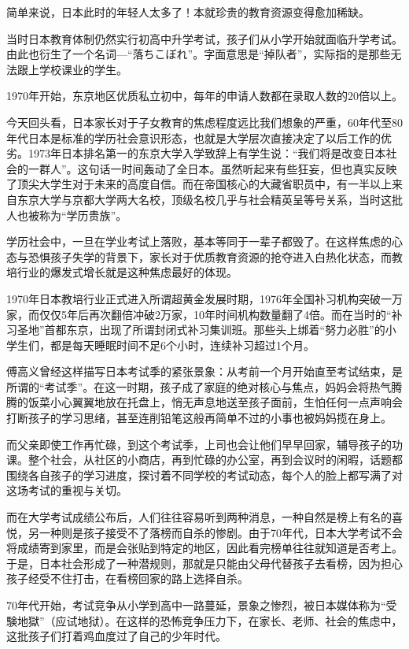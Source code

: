 简单来说，日本此时的年轻人太多了！本就珍贵的教育资源变得愈加稀缺。

当时日本教育体制仍然实行初高中升学考试，孩子们从小学开始就面临升学考试。由此也衍生了一个名词—“落ちこぼれ”。字面意思是“掉队者”，实际指的是那些无法跟上学校课业的学生。

1970年开始，东京地区优质私立初中，每年的申请人数都在录取人数的20倍以上。

今天回头看，日本家长对于子女教育的焦虑程度远比我们想象的严重，60年代至80年代日本是标准的学历社会意识形态，也就是大学层次直接决定了以后工作的优劣。1973年日本排名第一的东京大学入学致辞上有学生说：“我们将是改变日本社会的一群人”。这句话一时间轰动了全日本。虽然听起来有些狂妄，但也真实反映了顶尖大学生对于未来的高度自信。而在帝国核心的大藏省职员中，有一半以上来自东京大学与京都大学两大名校，顶级名校几乎与社会精英呈等号关系，当时这批人也被称为“学历贵族”。

学历社会中，一旦在学业考试上落败，基本等同于一辈子都毁了。在这样焦虑的心态与恐惧孩子失学的背景下，家长对于优质教育资源的抢夺进入白热化状态，而教培行业的爆发式增长就是这种焦虑最好的体现。

1970年日本教培行业正式进入所谓超黄金发展时期，1976年全国补习机构突破一万家，而仅仅5年后再次翻倍冲破2万家，10年时间机构数量翻了4倍。而在当时的“补习圣地”首都东京，出现了所谓封闭式补习集训班。那些头上绑着“努力必胜”的小学生们，都是每天睡眠时间不足6个小时，连续补习超过1个月。

傅高义曾经这样描写日本考试季的紧张景象：从考前一个月开始直至考试结束，是所谓的“考试季”。在这一时期，孩子成了家庭的绝对核心与焦点，妈妈会将热气腾腾的饭菜小心翼翼地放在托盘上，悄无声息地送至孩子面前，生怕任何一点声响会打断孩子的学习思绪，甚至连削铅笔这般再简单不过的小事也被妈妈揽在身上。

而父亲即使工作再忙碌，到这个考试季，上司也会让他们早早回家，辅导孩子的功课。整个社会，从社区的小商店，再到忙碌的办公室，再到会议时的闲暇，话题都围绕各自孩子的学习进度，探讨着不同学校的考试动态，每个人的脸上都写满了对这场考试的重视与关切。

而在大学考试成绩公布后，人们往往容易听到两种消息，一种自然是榜上有名的喜悦，另一种则是孩子接受不了落榜而自杀的惨剧。由于70年代，日本大学考试不会将成绩寄到家里，而是会张贴到特定的地区，因此看完榜单往往就知道是否考上。于是，日本社会形成了一种潜规则，那就是只能由父母代替孩子去看榜，因为担心孩子经受不住打击，在看榜回家的路上选择自杀。

70年代开始，考试竞争从小学到高中一路蔓延，景象之惨烈，被日本媒体称为“受験地獄”（应试地狱）。在这样的恐怖竞争压力下，在家长、老师、社会的焦虑中，这批孩子们打着鸡血度过了自己的少年时代。

